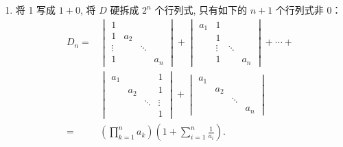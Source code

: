\documentclass[UTF8,12pt,a4paper,fontset=fandol]{ctexart}
\begin{document}
\begin{solve}
\begin{enumerate}
                \item 将 1 写成 $1+0$, 将 $D$ 硬拆成 $2^{n}$ 个行列式, 只有如下的 $n+1$ 个行列式非 0：
                      \begin{align*}
                          D_n = & \begin{vmatrix}
                                      1      &       &        &       \\
                                      1      & a_{2} &        &       \\
                                      \vdots &       & \ddots &       \\
                                      1      &       &        & a_{n}
                                  \end{vmatrix}
                          +\begin{vmatrix}
                               a_{1} & 1      &                \\
                                     & 1      &                \\
                                     & \vdots & \ddots &       \\
                                     & 1      &        & a_{n}
                           \end{vmatrix}+\cdots+                    \\
                                & \begin{vmatrix}
                                      a_{1} &       &        & 1      \\
                                            & a_{2} &        & 1      \\
                                            &       & \ddots & \vdots \\
                                            &       &        & 1
                                  \end{vmatrix}
                          +\begin{vmatrix}
                               a_{1} &                      \\
                                     & a_{2} &              \\
                                     &       & \ddots &     \\
                                     &       &        & a_n
                           \end{vmatrix}                       \\
                          =     & \left(\prod_{k=1}^na_k\right)
                          \left(1+\sum_{i=1}^n\frac{1}{a_i}\right).
                      \end{align*}
            \end{enumerate}
\end{solve}
\end{document}
